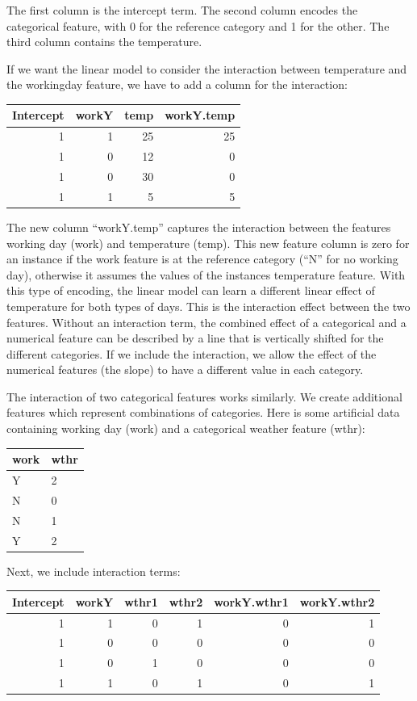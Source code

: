 \documentclass[
  12pt,
]{krantz}
\begin{document}
The first column is the intercept term.
The second column encodes the categorical feature, with 0 for the reference category and 1 for the other.
The third column contains the temperature.

If we want the linear model to consider the interaction between temperature and the workingday feature, we have to add a column for the interaction:

\begin{tabular}{r|r|r|r}
\hline
Intercept & workY & temp & workY.temp\\
\hline
1 & 1 & 25 & 25\\
\hline
1 & 0 & 12 & 0\\
\hline
1 & 0 & 30 & 0\\
\hline
1 & 1 & 5 & 5\\
\hline
\end{tabular}

The new column ``workY.temp'' captures the interaction between the features working day (work) and temperature (temp).
This new feature column is zero for an instance if the work feature is at the reference category (``N'' for no working day), otherwise it assumes the values of the instances temperature feature.
With this type of encoding, the linear model can learn a different linear effect of temperature for both types of days.
This is the interaction effect between the two features.
Without an interaction term, the combined effect of a categorical and a numerical feature can be described by a line that is vertically shifted for the different categories.
If we include the interaction, we allow the effect of the numerical features (the slope) to have a different value in each category.

The interaction of two categorical features works similarly.
We create additional features which represent combinations of categories.
Here is some artificial data containing working day (work) and a categorical weather feature (wthr):

\begin{tabular}{l|l}
\hline
work & wthr\\
\hline
Y & 2\\
\hline
N & 0\\
\hline
N & 1\\
\hline
Y & 2\\
\hline
\end{tabular}

Next, we include interaction terms:

\begin{tabular}{r|r|r|r|r|r}
\hline
Intercept & workY & wthr1 & wthr2 & workY.wthr1 & workY.wthr2\\
\hline
1 & 1 & 0 & 1 & 0 & 1\\
\hline
1 & 0 & 0 & 0 & 0 & 0\\
\hline
1 & 0 & 1 & 0 & 0 & 0\\
\hline
1 & 1 & 0 & 1 & 0 & 1\\
\hline
\end{tabular}
\end{document}
